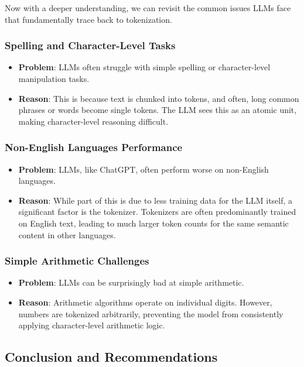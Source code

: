 Now with a deeper understanding, we can revisit the common issues LLMs face that fundamentally trace back to tokenization.

\subsubsection{Spelling and Character-Level Tasks}
\begin{itemize}
    \item \textbf{Problem}: LLMs often struggle with simple spelling or character-level manipulation tasks.
    \item \textbf{Reason}: This is because text is chunked into tokens, and often, long common phrases or words become single tokens. The LLM sees this as an atomic unit, making character-level reasoning difficult.
\end{itemize}

\subsubsection{Non-English Languages Performance}
\begin{itemize}
    \item \textbf{Problem}: LLMs, like ChatGPT, often perform worse on non-English languages.
    \item \textbf{Reason}: While part of this is due to less training data for the LLM itself, a significant factor is the tokenizer. Tokenizers are often predominantly trained on English text, leading to much larger token counts for the same semantic content in other languages.
\end{itemize}

\subsubsection{Simple Arithmetic Challenges}
\begin{itemize}
    \item \textbf{Problem}: LLMs can be surprisingly bad at simple arithmetic.
    \item \textbf{Reason}: Arithmetic algorithms operate on individual digits. However, numbers are tokenized arbitrarily, preventing the model from consistently applying character-level arithmetic logic.
\end{itemize}

\subsection{Conclusion and Recommendations}

